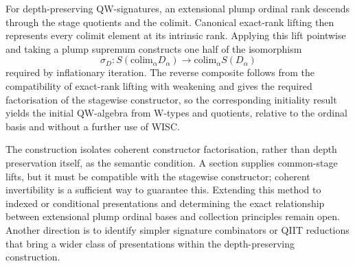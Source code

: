 \documentclass[runningheads]{llncs}
\begin{document}
For depth-preserving QW-signatures, an extensional plump ordinal rank
descends through the stage quotients and the colimit. Canonical
exact-rank lifting then represents every colimit element at its
intrinsic rank. Applying this lift pointwise and taking a plump supremum
constructs one half of the isomorphism \[
\sigma_D:S \left(\mathrm{colim}_\alpha D_\alpha\right)
\longrightarrow
\mathrm{colim}_\alpha S (D_\alpha)
\] required by inflationary iteration. The reverse composite follows from
the compatibility of exact-rank lifting with weakening and gives the
required factorisation of the stagewise constructor, so the corresponding
initiality result yields the initial QW-algebra from W-types and quotients,
relative to the ordinal basis and without a further use of WISC.

The construction isolates coherent constructor factorisation, rather
than depth preservation itself, as the semantic condition. A section
supplies common-stage lifts, but it must be compatible with the
stagewise constructor; coherent invertibility is a sufficient way to
guarantee this.  Extending this method to indexed or conditional
presentations and determining the exact relationship between
extensional plump ordinal bases and collection principles remain open.
Another direction is to identify simpler signature combinators or QIIT
reductions that bring a wider class of presentations within the
depth-preserving construction.


\end{document}
